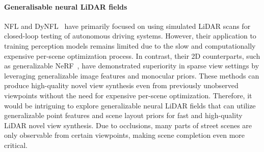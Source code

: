 \paragraph{Generalisable neural LiDAR fields}
NFL and DyNFL~\cite{Huang2023nfl,Wu2023dynfl} have primarily focused on using simulated LiDAR scans for closed-loop testing of autonomous driving systems. However, their application to training perception models remains limited due to the slow and computationally expensive per-scene optimization process. In contrast, their 2D counterparts, such as generalizable NeRF~\cite{yu2021pixelnerf,chen2021mvsnerf}, have demonstrated superiority in sparse view settings by leveraging generalizable image features and monocular priors. These methods can produce high-quality novel view synthesis even from previously unobserved viewpoints without the need for expensive per-scene optimization. Therefore, it would be intriguing to explore generalizable neural LiDAR fields that can utilize generalizable point features and scene layout priors for fast and high-quality LiDAR novel view synthesis. Due to occlusions, many parts of street scenes are only observable from certain viewpoints, making scene completion even more critical.


